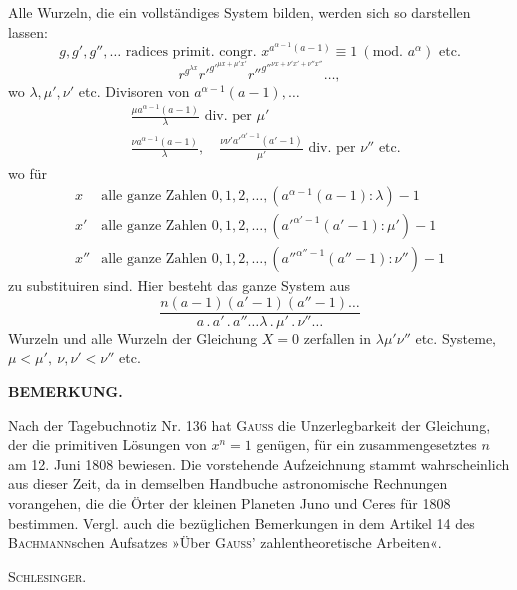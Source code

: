 Alle Wurzeln, die ein vollständiges System bilden, werden sich so darstellen lassen:
\[g,g',g'',\ldots\text{ radices primit. congr. }x^{a^{\alpha-1}(a-1)}\equiv1\ (\text{mod. }a^\alpha)\text{ etc.}\]
\[r^{g^{\lambda x}}{r'}^{{g'}^{\mu x+\mu'x'}}{r''}^{{g''}^{\nu x+\nu'x'+\nu''x''}}\ldots,\]
\clearpage
{}
\noindent wo $\lambda,\mu',\nu'$ etc. Divisoren von $a^{\alpha-1}(a-1),\ldots$
\[\begin{aligned}
&\frac{\mu a^{\alpha-1}(a-1)}\lambda\text{ div. per }\mu'\\[5pt]
&\frac{\nu a^{\alpha-1}(a-1)}\lambda,\quad\frac{\nu\nu'{a'}^{\alpha'-1}(a'-1)}{\mu'}\text{ div. per }\nu''\text{ etc.}
\end{aligned}\]
\noindent [und] wo für
\[\begin{array}{rl}
x&\text{alle ganze Zahlen }0,1,2,\ldots,(a^{\alpha-1}(a-1):\lambda)-1\\[5pt]
x'&\text{alle ganze Zahlen }0,1,2,\ldots,({a'}^{\alpha'-1}(a'-1):\mu')-1\\[5pt]
x''&\text{alle ganze Zahlen }0,1,2,\ldots,({a''}^{\alpha''-1}(a''-1):\nu'')-1
\end{array}\]
\noindent zu substituiren sind. Hier besteht das ganze System aus
\[\frac{n(a-1)(a'-1)(a''-1)\ldots}{a\mathpunct{.}a'\mathpunct{.}a''\ldots\lambda\mathpunct{.}\mu'\mathpunct{.}\nu''\ldots}\]
\noindent Wurzeln und alle Wurzeln der Gleichung $X=0$ zerfallen in $\lambda\mu'\nu''$ etc.
Systeme, $\mu<\mu',\ \nu,\nu'<\nu''$ etc.
\begin{center}\textbf{BEMERKUNG.}\end{center}
\begingroup\small
\noindent\hspace*{\parindent}Nach der Tagebuchnotiz Nr. 136 hat \textsc{Gauss} die Unzerlegbarkeit
der Gleichung, der die primitiven Lösungen von $x^n=1$ genügen, für ein zusammengesetztes $n$
am 12. Juni 1808 bewiesen. Die vorstehende Aufzeichnung stammt wahrscheinlich aus dieser Zeit,
da in demselben Handbuche astronomische Rechnungen vorangehen, die die Örter der kleinen Planeten
Juno und Ceres für 1808 bestimmen. Vergl. auch die bezüglichen Bemerkungen in dem Artikel 14
des \textsc{Bachmann}schen Aufsatzes »Über \textsc{Gauss}’ zahlentheoretische Arbeiten«.
\par\noindent\hfill\textsc{Schlesinger}.\par
\endgroup
\ClosingRule
\clearpage
